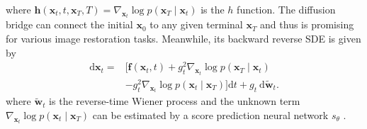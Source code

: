 where $\mathbf{h}(\mathbf{x}_t, t, \mathbf{x}_T, T) = \nabla_{\mathbf{x}_t} \log p(\mathbf{x}_T \mid \mathbf{x}_t)$ is the $h$ function. The diffusion bridge can connect the initial $\mathbf{x}_0$ to any given terminal $\mathbf{x}_T$ and thus is promising for various image restoration tasks. Meanwhile, its backward reverse SDE \cite{ANDERSON1982313} is given by
\begin{equation}\label{reverse-bridge-sde}
\begin{aligned}
\mathrm{d} \mathbf{x}_t = & \Big[ \mathbf{f}(\mathbf{x}_t, t) + g^2_t \nabla_{\mathbf{x}_t} \log p(\mathbf{x}_T \mid \mathbf{x}_t) \\
& - g_t^2\nabla_{\mathbf{x}_t} \log p(\mathbf{x}_t \mid \mathbf{x}_T) \Big] \mathrm{d} t+g_t \mathrm{~d} \tilde{\mathbf{w}}_t.
\end{aligned}
\end{equation}
where $\tilde{\mathbf{w}}_t$ is the reverse-time Wiener process and the unknown term $\nabla_{\mathbf{x}_t} \log p(\mathbf{x}_t \mid \mathbf{x}_T)$ can be estimated by a score prediction neural network $s_{\theta}$ \cite{song2021scorebasedgenerativemodelingstochastic}.
